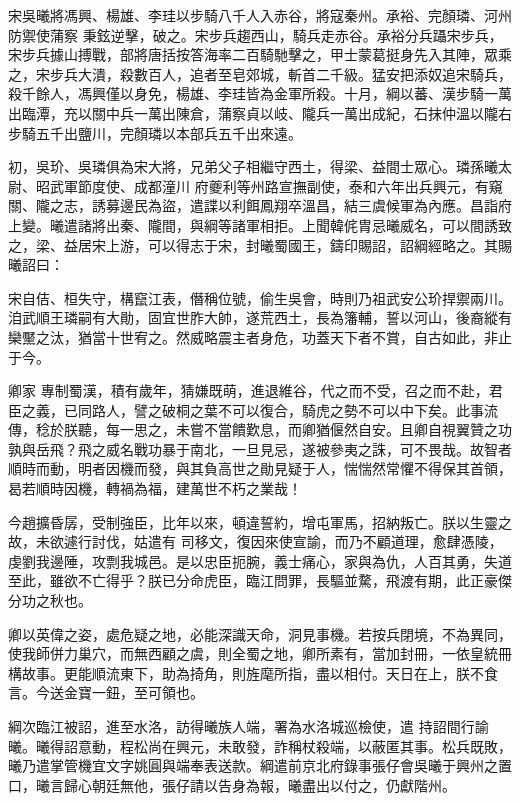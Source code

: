 \begin{pinyinscope}
 宋吳曦將馮興、楊雄、李珪以步騎八千人入赤谷，將寇秦州。承裕、完顏璘、河州防禦使蒲察
 秉鉉逆擊，破之。宋步兵趨西山，騎兵走赤谷。承裕分兵躡宋步兵，宋步兵據山搏戰，部將唐括按答海率二百騎馳擊之，甲士蒙葛挺身先入其陣，眾乘之，宋步兵大潰，殺數百人，追者至皂郊城，斬首二千級。猛安把添奴追宋騎兵，殺千餘人，馮興僅以身免，楊雄、李珪皆為金軍所殺。十月，綱以蕃、漢步騎一萬出臨潭，充以關中兵一萬出陳倉，蒲察貞以岐、隴兵一萬出成紀，石抹仲溫以隴右步騎五千出鹽川，完顏璘以本部兵五千出來遠。



 初，吳玠、吳璘俱為宋大將，兄弟父子相繼守西土，得梁、益間士眾心。璘孫曦太尉、昭武軍節度使、成都潼川
 府夔利等州路宣撫副使，泰和六年出兵興元，有窺關、隴之志，誘募邊民為盜，遣諜以利餌鳳翔卒溫昌，結三虞候軍為內應。昌詣府上變。曦遣諸將出秦、隴間，與綱等諸軍相拒。上聞韓侂胄忌曦威名，可以間誘致之，梁、益居宋上游，可以得志于宋，封曦蜀國王，鑄印賜詔，詔綱經略之。其賜曦詔曰：



 宋自佶、桓失守，構竄江表，僭稱位號，偷生吳會，時則乃祖武安公玠捍禦兩川。洎武順王璘嗣有大勛，固宜世胙大帥，遂荒西土，長為籓輔，誓以河山，後裔縱有欒黶之汰，猶當十世宥之。然威略震主者身危，功蓋天下者不賞，自古如此，非止于今。



 卿家
 專制蜀漢，積有歲年，猜嫌既萌，進退維谷，代之而不受，召之而不赴，君臣之義，已同路人，譬之破桐之葉不可以復合，騎虎之勢不可以中下矣。此事流傳，稔於朕聽，每一思之，未嘗不當饋歎息，而卿猶偃然自安。且卿自視翼贊之功孰與岳飛？飛之威名戰功暴于南北，一旦見忌，遂被參夷之誅，可不畏哉。故智者順時而動，明者因機而發，與其負高世之勛見疑于人，惴惴然常懼不得保其首領，曷若順時因機，轉禍為福，建萬世不朽之業哉！



 今趙擴昏孱，受制強臣，比年以來，頓違誓約，增屯軍馬，招納叛亡。朕以生靈之故，未欲遽行討伐，姑遣有
 司移文，復因來使宣諭，而乃不顧道理，愈肆憑陵，虔劉我邊陲，攻剽我城邑。是以忠臣扼腕，義士痛心，家與為仇，人百其勇，失道至此，雖欲不亡得乎？朕已分命虎臣，臨江問罪，長驅並騖，飛渡有期，此正豪傑分功之秋也。



 卿以英偉之姿，處危疑之地，必能深識天命，洞見事機。若按兵閉境，不為異同，使我師併力巢穴，而無西顧之虞，則全蜀之地，卿所素有，當加封冊，一依皇統冊構故事。更能順流東下，助為掎角，則旌麾所指，盡以相付。天日在上，朕不食言。今送金寶一鈕，至可領也。



 綱次臨江被詔，進至水洛，訪得曦族人端，署為水洛城巡檢使，遣
 持詔間行諭曦。曦得詔意動，程松尚在興元，未敢發，詐稱杖殺端，以蔽匿其事。松兵既敗，曦乃遣掌管機宜文字姚圓與端奉表送款。綱遣前京北府錄事張仔會吳曦于興州之置口，曦言歸心朝廷無他，張仔請以告身為報，曦盡出以付之，仍獻階州。




\end{pinyinscope}
